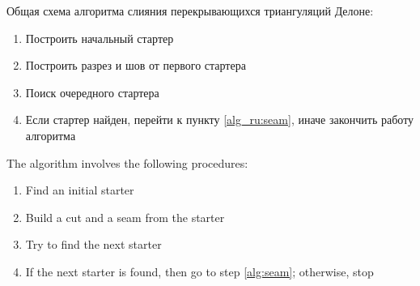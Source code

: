 \documentclass[12pt]{article}
\begin{document}
{\color{green}
Общая схема алгоритма слияния перекрывающихся триангуляций Делоне:

\begin{enumerate}
	\item Построить начальный стартер
	\item \label{alg_ru:seam} Построить разрез и шов от первого стартера
	\item Поиск очередного стартера
	\item Если стартер найден, перейти к пункту \ref{alg_ru:seam}, иначе закончить работу алгоритма
\end{enumerate}
}

The algorithm involves the following procedures:
\begin{enumerate}
	\item Find an initial starter
	\item \label{alg:seam} Build a cut and a seam from the starter
	\item Try to find the next starter
	\item If the next starter is found, then go to step \ref{alg:seam}; otherwise, stop
\end{enumerate}

\newpage

{}
\end{document}
